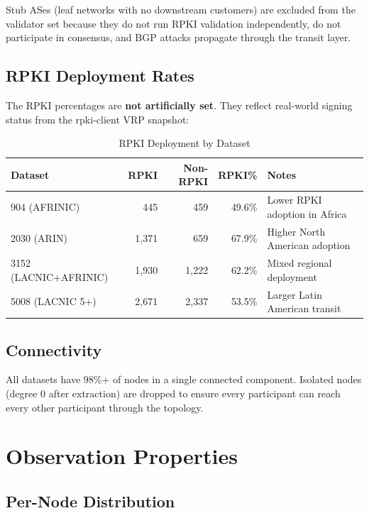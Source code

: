 \documentclass[11pt,a4paper]{article}
\begin{document}
Stub ASes (leaf networks with no downstream customers) are excluded from the
validator set because they do not run RPKI validation independently, do not
participate in consensus, and BGP attacks propagate through the transit layer.

\subsection{RPKI Deployment Rates}

The RPKI percentages are \textbf{not artificially set}. They reflect real-world
signing status from the rpki-client VRP snapshot:

\begin{table}[H]
\centering
\caption{RPKI Deployment by Dataset}
\begin{tabular}{lrrrl}
\toprule
\textbf{Dataset} & \textbf{RPKI} & \textbf{Non-RPKI} & \textbf{RPKI\%} & \textbf{Notes} \\
\midrule
904 (AFRINIC)  & 445   & 459   & 49.6\% & Lower RPKI adoption in Africa \\
2030 (ARIN)    & 1,371 & 659   & 67.9\% & Higher North American adoption \\
3152 (LACNIC+AFRINIC) & 1,930 & 1,222 & 62.2\% & Mixed regional deployment \\
5008 (LACNIC 5+) & 2,671 & 2,337 & 53.5\% & Larger Latin American transit \\
\bottomrule
\end{tabular}
\end{table}

\subsection{Connectivity}

All datasets have 98\%+ of nodes in a single connected component. Isolated nodes
(degree 0 after extraction) are dropped to ensure every participant can reach
every other participant through the topology.

\section{Observation Properties}

\subsection{Per-Node Distribution}
\end{document}
